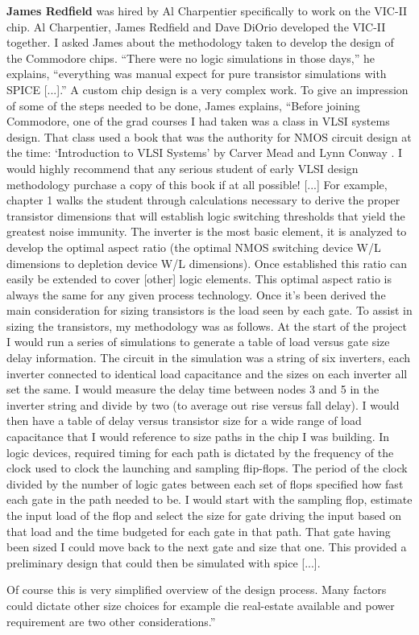 \begin{mytextframe}{.9\textwidth} \textbf{James Redfield} was hired
by Al Charpentier specifically to work on the VIC-II chip. Al Charpentier,
James Redfield and Dave DiOrio developed the VIC-II together. I asked James
about the methodology taken to develop the design of the Commodore chips.
``There were no logic simulations in those days,'' he explains, ``everything
was manual expect for pure transistor simulations with SPICE [...].''
A custom chip design is a very complex work. To
give an impression of some of the steps needed to be done, James explains,
``Before joining Commodore, one of the grad courses I had taken was a class
in VLSI systems design.  That class used a book that was the authority for
NMOS circuit design at the time: `Introduction to VLSI Systems' by Carver
Mead and Lynn Conway \cite{Mead79}.  I would highly recommend that any
serious student of early VLSI design methodology purchase a copy of this
book if at all possible! [...] For example, chapter 1 walks the student
through calculations necessary to derive the proper transistor dimensions
that will establish logic switching thresholds that yield the greatest noise
immunity.  The inverter is the most basic element, it is analyzed to develop
the optimal aspect ratio (the optimal NMOS switching device W/L dimensions
to depletion device W/L dimensions).  Once established this ratio can easily
be extended to cover [other] logic elements. This optimal aspect ratio is
always the same for any given process technology.  Once it's been derived
the main consideration for sizing transistors is the load seen by each
gate.  To assist in sizing the transistors, my methodology was as follows.
At the start of the project I would run a series of simulations to generate
a table of load versus gate size delay information.  The circuit in the
simulation was a string of six inverters, each inverter connected to
identical load capacitance and the sizes on each inverter all set the same.
I would measure the delay time between nodes 3 and 5 in the inverter string
and divide by two (to average out rise versus fall delay).  I would then
have a table of delay versus transistor size for a wide range of load
capacitance that I would reference to size paths in the chip I was
building.  In logic devices, required timing for each path is dictated by
the frequency of the clock used to clock the launching and sampling
flip-flops.  The period of the clock divided by the number of logic gates
between each set of flops specified how fast each gate in the path needed to
be.  I would start with the sampling flop, estimate the input load of the
flop and select the size for gate driving the input based on that load and
the time budgeted for each gate in that path.  That gate having been sized I
could move back to the next gate and size that one.  This provided a
preliminary design that could then be simulated with spice [...].

Of course this is very simplified overview of the design process.  Many
factors could dictate other size choices for example die real-estate
available and power requirement are two other considerations.''
\end{mytextframe}


